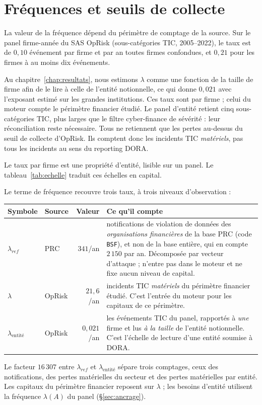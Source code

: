 
\section{Fréquences et seuils de collecte}


La valeur de la fréquence dépend du périmètre de comptage de la source. Sur le
panel firme-année du SAS OpRisk (sous-catégories TIC, 2005--2022), le taux est de $0{,}10$ événement
par firme et par an toutes firmes confondues, et $0{,}21$ pour les firmes à au moins dix événements.

Au chapitre~\ref{chap:resultats}, nous estimons $\lambda$ comme une fonction de la taille de firme afin
de le lire à celle de l'entité notionnelle, ce qui donne $0{,}021$ avec l'exposant estimé sur les grandes institutions. Ces taux sont par firme ; celui du moteur compte le périmètre financier étudié. Le panel d'entité retient cinq sous-catégories TIC, plus larges que le filtre cyber-finance de sévérité : leur réconciliation reste nécessaire. Tous ne retiennent que les pertes au-dessus du seuil de collecte d'OpRisk. Ils comptent
donc les incidents TIC \emph{matériels}, pas tous les incidents au sens du reporting DORA.

Le taux par firme est une propriété d'entité, lisible sur un panel. Le tableau~\ref{tab:echelle} traduit ces échelles en capital.

Le terme de fréquence recouvre trois taux, à trois niveaux d'observation :
\begin{center}\small
\renewcommand{\arraystretch}{1.3}
\begin{tabular}{@{}l l r p{5.1cm}@{}}
\toprule
\textbf{Symbole} & \textbf{Source} & \textbf{Valeur} & \textbf{Ce qu'il compte} \\
\midrule
$\lambda_{ref}$ & PRC & $341$/an & notifications de violation de données des
\emph{organisations financières} de la base PRC (code \texttt{BSF}), et non de la base
entière, qui en compte $2\,150$ par an. Décomposée par vecteur d'attaque ; n'entre pas dans le moteur et ne fixe aucun niveau de capital. \\
$\lambda$ & OpRisk & $21{,}6$/an & incidents TIC \emph{matériels} du
périmètre financier étudié. C'est l'entrée du moteur pour les capitaux de ce périmètre. \\
$\lambda_{\text{entité}}$ & OpRisk & $0{,}021$/an & les événements TIC du panel, rapportés
à \emph{une} firme et lus \emph{à la taille} de l'entité notionnelle. C'est
l'échelle de lecture d'une entité soumise à DORA. \\
\bottomrule
\end{tabular}
\end{center}
Le facteur $16\,307$ entre $\lambda_{ref}$ et $\lambda_{\text{entité}}$ sépare trois comptages, ceux des notifications, des pertes
matérielles du secteur et des pertes matérielles par entité. Les capitaux du périmètre financier
reposent sur $\lambda$ ; les besoins d'entité utilisent la fréquence $\lambda(A)$ du panel
(\S\ref{sec:ancrage}).

